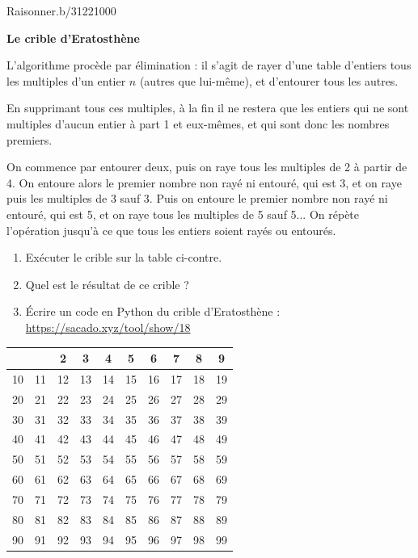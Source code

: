 \begin{pageAlgo}
\begin{ExoCt}{Raisonner.}{b/312}{2}{1}{0}{0}{0}
 
 \begin{minipage}{0.5\linewidth} 
 
\textbf{Le crible d'Eratosthène}

L'algorithme procède par élimination : il s'agit de rayer d'une table d'entiers tous les multiples d'un entier $n$ (autres que lui-même), et d'entourer
tous les autres. 

En supprimant tous ces multiples, à la fin il ne restera que les entiers qui ne sont multiples d'aucun entier à part 1 et eux-mêmes, et qui sont donc les nombres premiers.

On commence par entourer deux, puis on raye tous
les multiples de 2 à partir de 4. On entoure alors le premier
nombre non rayé ni entouré, qui est 3, et on raye puis les multiples de 3
sauf 3. Puis on entoure le premier nombre non rayé ni entouré, qui est
5, et on raye tous les multiples de 5 sauf 5... On répète l'opération
jusqu'à ce que tous les entiers soient rayés ou entourés. 

\begin{enumerate}

\item Exécuter le crible sur la table ci-contre.
\item Quel est le résultat de ce crible ? 

\item Écrire un code en Python du crible d'Eratosthène : \url{https://sacado.xyz/tool/show/18}

\end{enumerate}

\end{minipage}
\begin{minipage}{0.5\linewidth}

 \begin{tabular}{|c|c|c|c|c|c|c|c|c|c|}
 \hline 
 &  & 2 & 3 & 4 & 5 & 6 & 7 & 8 & 9 \\ 
 \hline 
 10&11 & 12 & 13 & 14 & 15 & 16 & 17 & 18 & 19 \\
 \hline 
 20&21 & 22 & 23 & 24 & 25 & 26 & 27 & 28 & 29 \\
 \hline 
 30&31 & 32 & 33 & 34 & 35 & 36 & 37 & 38 & 39 \\
 \hline 
 40&41 & 42 & 43 & 44 & 45 & 46 & 47 & 48 & 49 \\
 \hline 
 50&51 & 52 & 53 & 54 & 55 & 56 & 57 & 58 & 59 \\
 \hline 
 60&61 & 62 & 63 & 64 & 65 & 66 & 67 & 68 & 69 \\
 \hline 
 70&71 & 72 & 73 & 74 & 75 & 76 & 77 & 78 & 79 \\
 \hline 
 80&81 & 82 & 83 & 84 & 85 & 86 & 87 & 88 & 89 \\
 \hline 
 90&91 & 92 & 93 & 94 & 95 & 96 & 97 & 98 & 99 \\
 \hline 
 \end{tabular}  
 

\end{minipage}
\end{ExoCt}
\end{pageAlgo}

